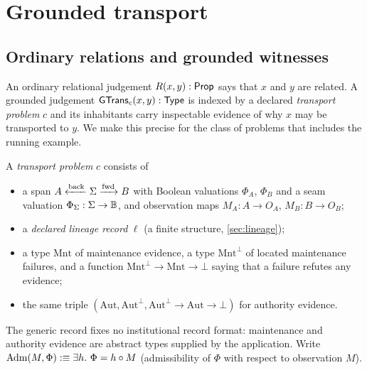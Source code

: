 \section{Grounded transport}\label{sec:gt}

\subsection{Ordinary relations and grounded witnesses}\label{sec:witnesses}
An ordinary relational judgement $R(x,y) : \mathsf{Prop}$ says that $x$ and $y$ are related. A grounded judgement $\mathsf{GTrans}_c(x,y) : \mathsf{Type}$ is indexed by a declared \emph{transport problem} $c$ and its inhabitants carry inspectable evidence of why $x$ may be transported to $y$. We make this precise for the class of problems that includes the running example.

\begin{defi}\label{def:problem}
A \emph{transport problem} $c$ consists of
\begin{itemize}
\item a span $A \xleftarrow{\mathrm{back}} \Sigma \xrightarrow{\mathrm{fwd}} B$ with Boolean valuations $\Phi_A$, $\Phi_B$ and a seam valuation $\Phi_\Sigma : \Sigma \to \mathbb{B}$, and observation maps $M_A : A \to O_A$, $M_B : B \to O_B$;
\item a \emph{declared lineage record} $\ell$ (a finite structure, \cref{sec:lineage});
\item a type $\mathrm{Mnt}$ of maintenance evidence, a type $\mathrm{Mnt}^\bot$ of located maintenance failures, and a function $\mathrm{Mnt}^\bot \to \mathrm{Mnt} \to \bot$ saying that a failure refutes any evidence;
\item the same triple $(\mathrm{Aut}, \mathrm{Aut}^\bot, \mathrm{Aut}^\bot \to \mathrm{Aut} \to \bot)$ for authority evidence.
\end{itemize}
\end{defi}
The generic record fixes no institutional record format: maintenance and authority evidence are abstract types supplied by the application. Write $\mathrm{Adm}(M,\Phi) :\equiv \exists h.\ \Phi = h \circ M$ (admissibility of $\Phi$ with respect to observation $M$).

